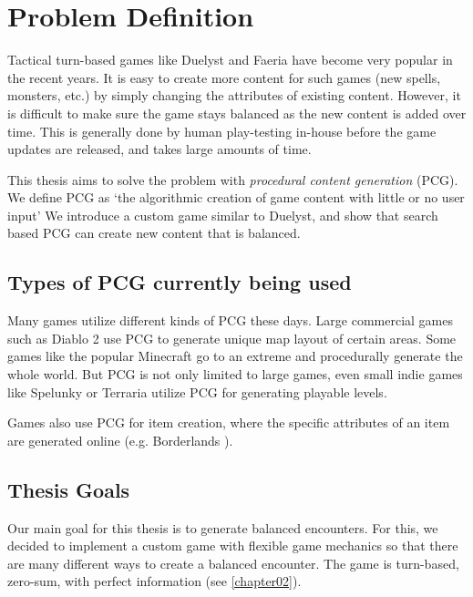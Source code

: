 \chapter{Problem Definition}
\label{chapter01}

Tactical turn-based games like Duelyst \citep{duelyst} and Faeria \citep{faeria} have become very popular in the recent years. It is easy to create more content for such games (new spells, monsters, etc.) by simply changing the attributes of existing content. However, it is difficult to make sure the game stays balanced as the new content is added over time. This is generally done by human play-testing in-house before the game updates are released, and takes large amounts of time.

This thesis aims to solve the problem with \emph{procedural content generation}
(PCG)\@. We define PCG as `the algorithmic creation of game content with
little or no user input' \citep{pcgbook} We introduce a custom game similar to
Duelyst, and show that search based PCG can create new content that is
balanced.

\section{Types of PCG currently being used}

Many games utilize different kinds of PCG these days. Large commercial games
such as Diablo 2 \citep{diablo} use PCG to generate unique map layout of certain areas.
Some games like the popular Minecraft \citep{minecraft} go to an extreme and procedurally
generate the whole world. But PCG is not only limited to large games, even
small indie games like Spelunky \citep{spelunky} or Terraria \citep{terraria} utilize
PCG for generating playable levels.

Games also use PCG for item creation, where the specific attributes of an item
are generated online (e.g. Borderlands \citep{borderlands}).

\section{Thesis Goals}

Our main goal for this thesis is to generate balanced encounters. For this, we
decided to implement a custom game with flexible game mechanics so that there
are many different ways to create a balanced encounter. The game is turn-based,
zero-sum, with perfect information (see \autoref{chapter02}).

